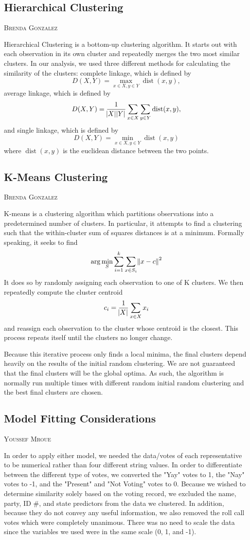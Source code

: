 \documentclass[12pt]{article}
\makeatletter
\DeclareMathOperator{\dist}{dist}
\newcommand{\chapterauthor}[1]{%
	{\parindent0pt\vspace*{-10pt}%
		\linespread{1.1}\large\scshape#1%
		\par\nobreak\vspace*{10pt}}
	\@afterheading%
}
\makeatother
\begin{document}
\subsection{Hierarchical Clustering}
\chapterauthor{Brenda Gonzalez}
Hierarchical Clustering is a bottom-up clustering algorithm. It starts out with each observation in its own cluster and repeatedly merges the two most similar clusters. In our analysis, we used three different methods for calculating the similarity of the clusters: complete linkage, which is defined by 
$$D(X,Y) = \max_{x\in X,y\in Y} \dist(x,y),$$
\noindent
average linkage, which is defined by 
$$D(X,Y) = \frac{1}{\abs{X}\abs{Y}} \sum_{x\in X}\sum_{y\in Y} \dist(x,y),$$
and single linkage, which is defined by 
$$D(X,Y) = \min_{x\in X,y\in Y} \dist(x,y)$$
where $\dist(x,y)$ is the euclidean distance between the two points. 
\subsection{K-Means Clustering}
\chapterauthor{Brenda Gonzalez}
K-means is a clustering algorithm which partitions observations into a predetermined number of clusters. In particular, it attempts to find a clustering such that the within-cluster sum of squares distances is at a minimum. Formally speaking, it seeks to find
$$\arg \min_{S}\sum_{i=1}^{k}\sum_{x\in S_i}\norm{x-c}^2$$
It does so by randomly assigning each observation to one of K clusters. We then repeatedly compute the cluster centroid 
$$c_i = \frac{1}{\abs{X}}\sum_{x\in X}x_i$$
and reassign each observation to the cluster whose centroid is the closest. This process repeats itself until the clusters no longer change. 

Because this iterative process only finds a local minima, the final clusters depend heavily on the results of the initial random clustering. We are not guaranteed that the final clusters will be the global optima. As such, the algorithm is normally run multiple times with different random initial random clustering and the best final clusters are chosen. 
\subsection{Model Fitting Considerations}
\chapterauthor{Youssef Mroue}
In order to apply either model, we needed the data/votes of each representative to be numerical rather than four different string values. In order to differentiate between the different type of votes, we converted the "Yay" votes to 1, the "Nay" votes to -1, and the "Present" and "Not Voting" votes to 0. Because we wished to determine similarity solely based on the voting record,  we excluded the name, party, ID \#, and state predictors from the data we clustered. In addition, because they do not convey any useful information, we also removed the roll call votes which were completely unanimous. There was no need to scale the data since the variables we used were in the same scale (0, 1, and -1). 
\end{document}
